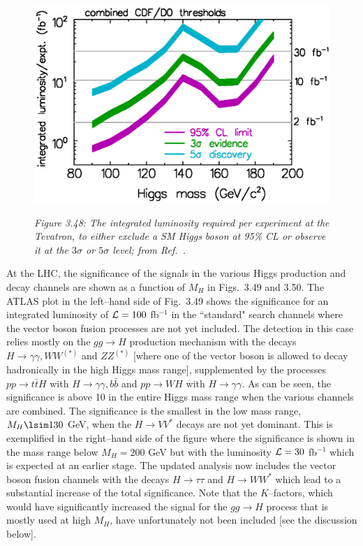 \begin{figure}[!h]
\vspace*{-0.5cm}
\begin{center}
\includegraphics[width=13.cm]{./sm3/Tevatron-reach.eps}
\vspace*{-0.6cm}
\end{center}
{\it Figure 3.48: The integrated luminosity required per experiment at the 
Tevatron, to either exclude a SM Higgs boson at 95\% CL or observe it at the 
$3\sigma$ or $5\sigma$ level; from 
Ref.~\cite{Higgs-TeV}.} 
\vspace*{-0.5cm}
\end{figure}

At the LHC, the significance of the signals in the various Higgs production and
decay channels are shown as a function of $M_H$ in Figs.~3.49 and 3.50. 
The ATLAS plot in the left--hand
side of Fig.~3.49 shows the significance for an integrated luminosity of ${\cal
L}= 100$ fb$^{-1}$ in the ``standard" search channels where the vector boson
fusion processes are not yet included. The detection in this case relies mostly
on the $gg \to H$ production mechanism with the decays $H\to \gamma \gamma,
WW^{(*)}$ and $ZZ^{(*)}$ [where one of the vector boson is allowed to decay
hadronically in the high Higgs mass range], supplemented by the processes $pp
\to t\bar  tH$ with $H \to \gamma \gamma, b\bar{b}$ and $pp \to WH$ with $H \to
\gamma \gamma$. As can be seen, the significance is above 10 in the entire
Higgs mass range when the various channels are combined. The significance is
the smallest in the low mass range, $M_H \lsim 130$ GeV, when the $H \to
VV^{*}$ decays are not yet dominant. This is exemplified in the right--hand
side of the figure where the significance is shown in the mass range below
$M_H=200$ GeV but with the luminosity ${\cal L}= 30$ fb$^{-1}$ which is
expected at an earlier stage. The updated analysis now includes the vector boson
fusion channels with the decays $H\to \tau \tau$ and $H\to WW^*$ which  lead to
a substantial increase of the total significance. Note that the $K$--factors,
which would have significantly increased the signal for the $gg \to H$
process that is mostly used at high $M_H$, have unfortunately not been
included [see the discussion below].

